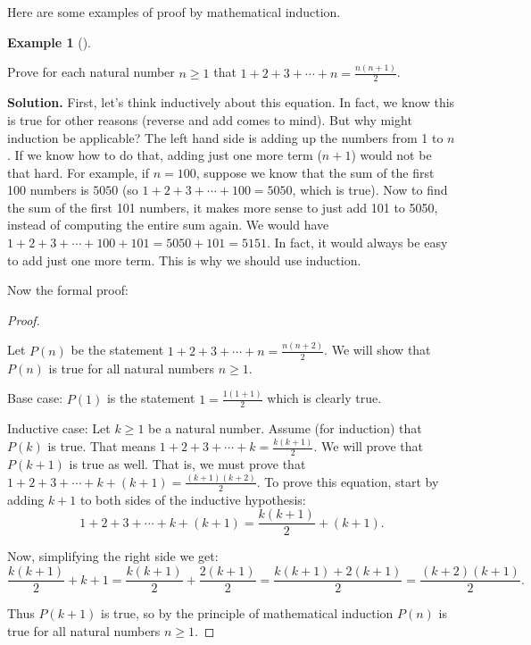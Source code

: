 \documentclass[10pt,]{book}
\theoremstyle{plain}
\theoremstyle{definition}
\newtheorem{example}[theorem]{Example}
\theoremstyle{definition}
\theoremstyle{definition}
\numberwithin{equation}{chapter}
\begin{document}
Here are some examples of proof by mathematical induction.
%
\begin{example}[]\label{example-79}

Prove for each natural number \(n \ge 1\) that \(1 + 2 + 3 + \cdots + n = \frac{n(n+1)}{2}\).
%
\par\medskip\noindent%
\textbf{Solution.}\quad
First, let's think inductively about this equation. In fact, we know this is true for other reasons (reverse and add comes to mind). But why might induction be applicable? The left hand side is adding up the numbers from 1 to \(n\). If we know how to do that, adding just one more term (\(n+1\)) would not be that hard. For example, if \(n = 100\), suppose we know that the sum of the first 100 numbers is \(5050\) (so \(1 + 2 + 3 + \cdots + 100 = 5050\), which is true). Now to find the sum of the first 101 numbers, it makes more sense to just add 101 to 5050, instead of computing the entire sum again. We would have \(1 + 2 + 3 + \cdots + 100 + 101 = 5050 + 101 = 5151\). In fact, it would always be easy to add just one more term. This is why we should use induction.
%
\par

Now the formal proof:
%
\begin{proof}\hypertarget{proof-14}{}

Let \(P(n)\) be the statement \(1 + 2 + 3 + \cdots + n = \frac{n(n+2)}{2}\). We will show that \(P(n)\) is true for all natural numbers \(n \ge 1\).
%
\par

Base case: \(P(1)\) is the statement \(1 = \frac{1(1+1)}{2}\) which is clearly true.
%
\par

Inductive case: Let \(k \ge 1\) be a natural number. Assume (for induction) that \(P(k)\) is true. That means \(1 + 2 + 3 + \cdots + k = \frac{k(k+1)}{2}\). We will prove that \(P(k+1)\) is true as well. That is, we must prove that \(1 + 2 + 3 + \cdots + k + (k+1) = \frac{(k+1)(k+2)}{2}\). To prove this equation, start by adding \(k+1\) to both sides of the inductive hypothesis:
\begin{equation*}
  1 + 2 + 3 + \cdots + k + (k+1) = \frac{k(k+1)}{2} + (k+1).
\end{equation*}
%
\par

Now, simplifying the right side we get:
\begin{equation*}
  \frac{k(k+1)}{2} + k+1 = \frac{k(k+1)}{2} + \frac{2(k+1)}{2} = \frac{k(k+1) + 2(k+1)}{2} = \frac{(k+2)(k+1)}{2}.
\end{equation*}
%
\par

Thus \(P(k+1)\) is true, so by the principle of mathematical induction \(P(n)\) is true for all natural numbers \(n \ge 1\).
%
\end{proof}
\end{example}
\end{document}
